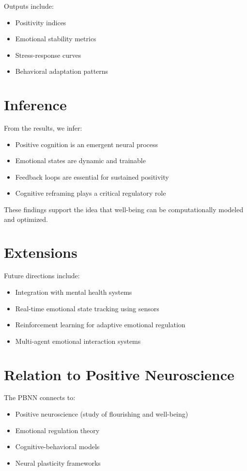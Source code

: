 \documentclass[12pt]{article}
\begin{document}
Outputs include:

\begin{itemize}
\item Positivity indices
\item Emotional stability metrics
\item Stress-response curves
\item Behavioral adaptation patterns
\end{itemize}

\section{Inference}

From the results, we infer:

\begin{itemize}
\item Positive cognition is an emergent neural process
\item Emotional states are dynamic and trainable
\item Feedback loops are essential for sustained positivity
\item Cognitive reframing plays a critical regulatory role
\end{itemize}

These findings support the idea that well-being can be computationally modeled and optimized.

\section{Extensions}

Future directions include:

\begin{itemize}
\item Integration with mental health systems
\item Real-time emotional state tracking using sensors
\item Reinforcement learning for adaptive emotional regulation
\item Multi-agent emotional interaction systems
\end{itemize}

\section{Relation to Positive Neuroscience}

The PBNN connects to:

\begin{itemize}
\item Positive neuroscience (study of flourishing and well-being)
\item Emotional regulation theory
\item Cognitive-behavioral models
\item Neural plasticity frameworks
\end{itemize}
\end{document}
